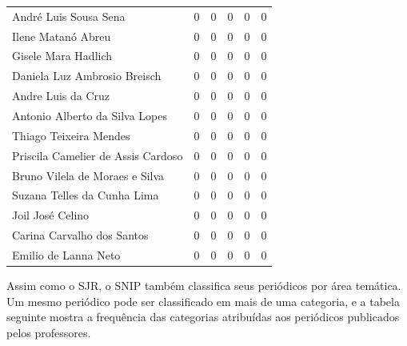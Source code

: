 \documentclass[12pt,brazil]{article}\usepackage[]{graphicx}\usepackage[]{xcolor}
\newcounter{tabela}
\begin{document}
\begin{longtable}{lrrrrr}
André Luis Sousa Sena & 0 & 0 & 0 & 0 & 0 \\
Ilene Matanó Abreu & 0 & 0 & 0 & 0 & 0 \\
Gisele Mara Hadlich & 0 & 0 & 0 & 0 & 0 \\
Daniela Luz Ambrosio Breisch & 0 & 0 & 0 & 0 & 0 \\
Andre Luis da Cruz & 0 & 0 & 0 & 0 & 0 \\
Antonio Alberto da Silva Lopes & 0 & 0 & 0 & 0 & 0 \\
Thiago Teixeira Mendes & 0 & 0 & 0 & 0 & 0 \\
Priscila Camelier de Assis Cardoso & 0 & 0 & 0 & 0 & 0 \\
Bruno Vilela de Moraes e Silva & 0 & 0 & 0 & 0 & 0 \\
Suzana Telles da Cunha Lima & 0 & 0 & 0 & 0 & 0 \\
\hline Joil José Celino & 0 & 0 & 0 & 0 & 0 \\
Carina Carvalho dos Santos & 0 & 0 & 0 & 0 & 0 \\
Emilio de Lanna Neto & 0 & 0 & 0 & 0 & 0 \\
\end{longtable}


\clearpage

Assim como o SJR, o SNIP também classifica seus periódicos por área temática.
Um mesmo periódico pode ser classificado em mais de uma categoria, e a tabela
seguinte mostra a frequência das categorias atribuídas aos periódicos
publicados pelos professores.
\end{document}
